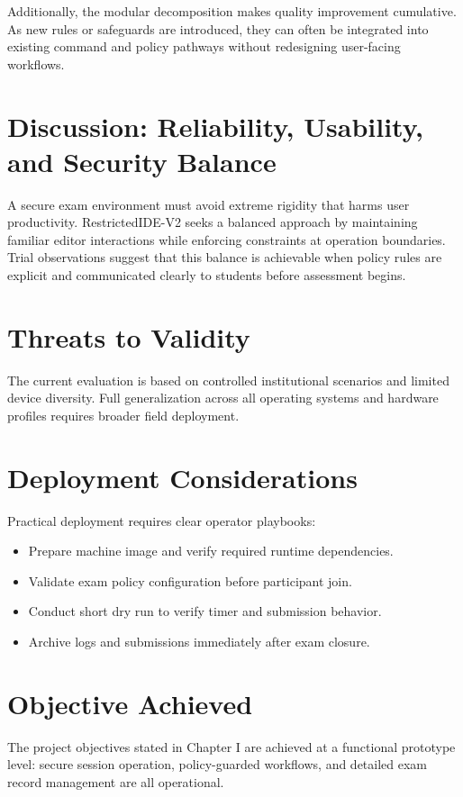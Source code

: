\documentclass[12pt,a4paper]{report}
\begin{document}
	Additionally, the modular decomposition makes quality improvement cumulative. As new rules or safeguards are introduced, they can often be integrated into existing command and policy pathways without redesigning user-facing workflows.
	
	\section{Discussion: Reliability, Usability, and Security Balance}
	A secure exam environment must avoid extreme rigidity that harms user productivity. RestrictedIDE-V2 seeks a balanced approach by maintaining familiar editor interactions while enforcing constraints at operation boundaries. Trial observations suggest that this balance is achievable when policy rules are explicit and communicated clearly to students before assessment begins.
	
	\section{Threats to Validity}
	The current evaluation is based on controlled institutional scenarios and limited device diversity. Full generalization across all operating systems and hardware profiles requires broader field deployment.
	
	\section{Deployment Considerations}
	Practical deployment requires clear operator playbooks:
	\begin{itemize}
		\item Prepare machine image and verify required runtime dependencies.
		\item Validate exam policy configuration before participant join.
		\item Conduct short dry run to verify timer and submission behavior.
		\item Archive logs and submissions immediately after exam closure.
	\end{itemize}
	
	\section{Objective Achieved}
	The project objectives stated in Chapter I are achieved at a functional prototype level: secure session operation, policy-guarded workflows, and detailed exam record management are all operational.
	
\end{document}
